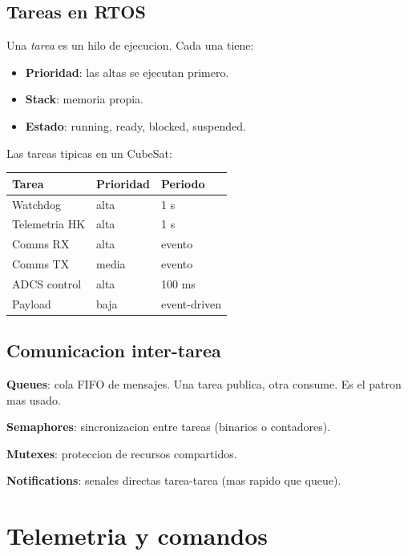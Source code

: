\documentclass[11pt,a4paper,oneside,openright]{book}
\begin{document}
\section{Tareas en RTOS}

Una \emph{tarea} es un hilo de ejecucion. Cada una tiene:
\begin{itemize}[leftmargin=2em]
  \item \textbf{Prioridad}: las altas se ejecutan primero.
  \item \textbf{Stack}: memoria propia.
  \item \textbf{Estado}: running, ready, blocked, suspended.
\end{itemize}

Las tareas tipicas en un CubeSat:

\begin{center}
\begin{tabular}{lll}
\toprule
\textbf{Tarea} & \textbf{Prioridad} & \textbf{Periodo} \\
\midrule
Watchdog              & alta      & 1 s \\
Telemetria HK         & alta      & 1 s \\
Comms RX               & alta      & evento \\
Comms TX               & media     & evento \\
ADCS control           & alta      & 100 ms \\
Payload                & baja      & event-driven \\
\bottomrule
\end{tabular}
\end{center}

\section{Comunicacion inter-tarea}

\textbf{Queues}: cola FIFO de mensajes. Una tarea publica, otra
consume. Es el patron mas usado.

\textbf{Semaphores}: sincronizacion entre tareas (binarios o contadores).

\textbf{Mutexes}: proteccion de recursos compartidos.

\textbf{Notifications}: senales directas tarea-tarea (mas rapido que
queue).

\chapter{Telemetria y comandos}
\end{document}
